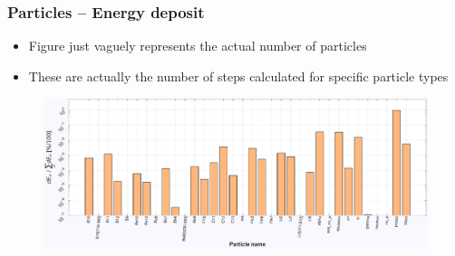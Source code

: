 \begin{frame}
\frametitle{Particles -- Energy deposit}

\begin{block}{}
	\begin{itemize}
		\item Figure just vaguely represents the actual number of particles
		\item These are actually the number of steps calculated for specific particle types
	\end{itemize}
\end{block}

\begin{figure}
	\includegraphics[width=\textwidth]{images/particle_dist_weighted_E120_phQGSP_INCLXX_HP.pdf}
\end{figure}

\end{frame}